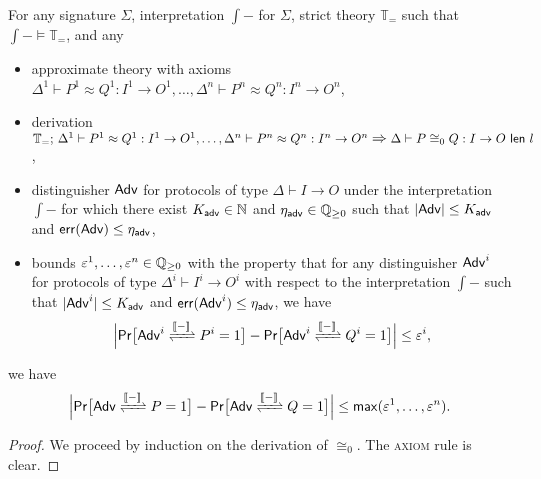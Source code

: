 \begin{lemma}\label{lem:soundness_congruence_approximate_0}
For any \ipdl signature $\Sigma$, interpretation $\int{-}$ for $\Sigma$, strict \ipdl theory $\mathbb{T}_=$ such that $\int{-} \vDash \mathbb{T}_=$, and any
\begin{itemize}
\item approximate \ipdl theory with axioms $\Delta^1 \vdash P^1 \approx Q^1 : I^1 \to O^1, \ldots, \Delta^n \vdash P^n \approx Q^n : I^n \to O^n$,

\item derivation $\mathbb{T}_=; \, \Delta^1 \vdash P^1 \approx Q^1 : I^1 \to O^1, \ldots, \Delta^n \vdash P^n \approx Q^n : I^n \to O^n \; \mathlarger{\mathlarger{\Rightarrow}} \; \Delta \vdash \lapproxcong{P}{Q}{I}{O}{l}{0}$,

\item distinguisher $\mathsf{Adv}$ for protocols of type $\Delta \vdash I \to O$ under the interpretation $\int{-}$ for which there exist $K_{\mathsf{adv}} \in \mathbb{N}$ and $\eta_{\mathsf{adv}} \in \mathbb{Q}_{\geq 0}$ such that $|\mathsf{Adv}| \leq K_{\mathsf{adv}}$ and $\mathsf{err}(\mathsf{Adv}) \leq \eta_{\mathsf{adv}}$,

\item bounds $\varepsilon^1,\ldots,\varepsilon^n \in \mathbb{Q}_{\geq 0}$ with the property that for any distinguisher $\mathsf{Adv}^i$ for protocols of type $\Delta^i \vdash I^i \to O^i$ with respect to the interpretation $\int{-}$ such that $|\mathsf{Adv}^i| \leq K_{\mathsf{adv}}$ and $\mathsf{err}(\mathsf{Adv}^i) \leq \eta_{\mathsf{adv}}$, we have
\[\Big|\mathsf{Pr}\big[\interaction{\Adv^i}{P^i}{\int{-}} = 1\big] - \mathsf{Pr}\big[\interaction{\Adv^i}{Q^i}{\int{-}} = 1\big]\Big| \leq \varepsilon^i,\]
\end{itemize}
we have
\[\Big|\mathsf{Pr}\big[\interaction{\Adv}{P}{\int{-}} = 1\big] - \mathsf{Pr}\big[\interaction{\Adv}{Q}{\int{-}} = 1\big]\Big| \leq \max(\varepsilon^1,\ldots,\varepsilon^n).\]
\end{lemma}

\begin{proof}
We proceed by induction on the derivation of $\cong_0$. The \textsc{axiom} rule is clear.
\end{proof}


